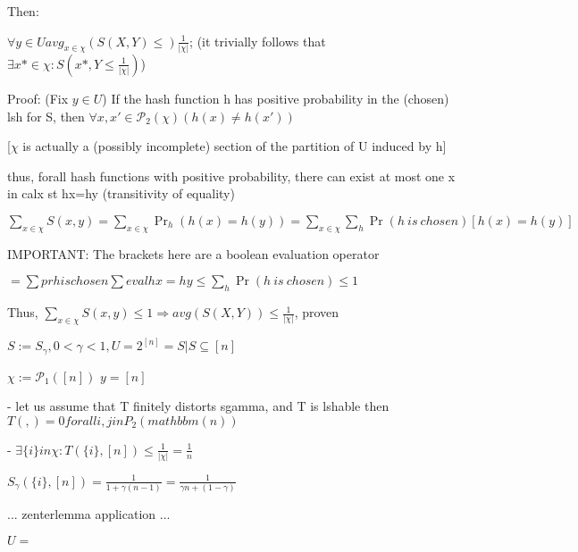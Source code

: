 	Then:
	
	$\forall y \in U avg_{x \in \chi}(S(X, Y) \leq) \frac{1}{|\chi|}$; (it trivially follows that $\exists x* \in \chi : S(x*, Y \leq \frac{1}{|\chi|})$)
	
	Proof: (Fix $y \in U$) If the hash function h has positive probability in the (chosen) lsh for S, then $\forall {x, x'} \in \mathcal{P}_2(\chi) (h(x)\neq h(x'))$
	
	[$\chi$ is actually a (possibly incomplete) section of the partition of U induced by h]
	
	thus, forall hash functions with positive probability, there can exist at most one x in calx st hx=hy (transitivity of equality)
	
	$\sum_{x \in \chi}S(x, y) = \sum_{x \in \chi}\Pr_h(h(x)=h(y)) = \sum_{x \in \chi}\sum_{h}\Pr(h\ is\ chosen)[h(x)=h(y)]$
	
	IMPORTANT: The brackets here are a boolean evaluation operator
	
	$= \sum pr h is chosen \sum eval hx = hy \leq \sum_h \Pr(h\ is\ chosen) \leq 1$
	
	Thus, $\sum_{x \in \chi}S(x, y) \leq 1 \Rightarrow avg(S(X, Y)) \leq \frac{1}{|\chi|}$, proven
	
	
	
	
	$S:= S_\gamma , 0 < \gamma < 1, U=2^{[n]}={S|S\subseteq [n]}$ %
	
	$\chi := \mathcal{P}_1([n])$
	$y = [n]$
	
	 - let us assume that T finitely distorts sgamma, and T is lshable
	then $T({},{}) = 0 forall {i, j} in P_2(mathbbm(n))$
	
	 - $\exists \{i\} in \chi : T(\{i\}, [n]) \leq \frac{1}{|\chi|} = \frac{1}{n}$
	 
	 $S_\gamma(\{i\}, [n]) = \frac{1}{1 + \gamma(n-1)} = \frac{1}{\gamma n + (1-\gamma)}$
	 
	 ...
	 zenterlemma application
	 ...
	
	
	
	$ U = {}$